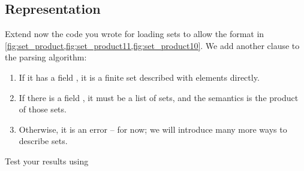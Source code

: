 
\subsection{Representation}


%

%

\begin{codeexercise}
    Extend now the code you wrote for loading sets to allow the format in \cref{fig:set_product,fig:set_product11,fig:set_product10}.
    We add another clause to the parsing algorithm:
    \begin{enumerate}
        \item If it has a field , it is a finite set described with elements directly.
        \item If there is a field , it must be a list of sets, and the semantics is the product of those sets.
        \item Otherwise, it is an error -- for now; we will introduce many more ways to describe sets.
    \end{enumerate}
    Test your results using
\end{codeexercise}
